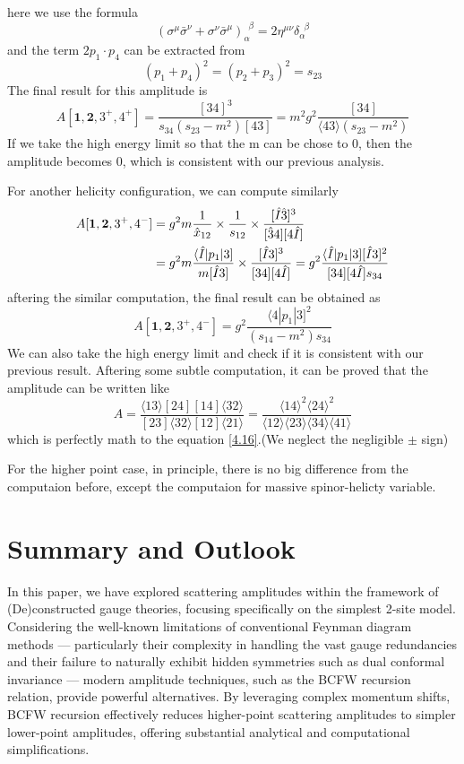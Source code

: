 \documentclass[12pt]{article}
\numberwithin{equation}{section}
\newcommand{\mdavg}[2]{\langle #1 \rangle\!\langle #2 \rangle}
\newcommand{\avg}[1]{\langle #1 \rangle}
\newcommand{\cbrak}[2]{\avg{#1}\![#2]}
\newcommand{\acbrak}[2]{[#1]\!\avg{#2}}
\newcommand{\asbra}[3]{\langle #1 | #2 |#3 ]}
\begin{document}
here we use the formula
\begin{equation}
    (\sigma^\mu\bar{\sigma}^\nu+\sigma^\nu\bar{\sigma}^\mu)_\alpha^{\phantom{a}\beta}=2\eta^{\mu\nu}\delta_\alpha^{\phantom{a}\beta}
\end{equation}
and the term $2p_1\cdot p_4$ can be extracted from
\begin{equation}
    (p_1+p_4)^2=(p_2+p_3)^2=s_{23}
\end{equation}
The final result for this amplitude is 
\begin{equation}
    A[\textbf{1},\textbf{2},3^+,4^+]=\frac{[34]^3}{s_{34}(s_{23}-m^2)[43]}=m^2g^2\frac{[34]}{\avg{43}(s_{23}-m^2)}
\end{equation}
If we take the high energy limit so that the m can be chose to 0, then the amplitude becomes 0, which is consistent with our previous analysis. 

For another helicity configuration, we can compute similarly
\begin{align}
    A[\textbf{1},\textbf{2},3^+,4^-]&=g^2m\frac{1}{\hat{x}_{12}}\times\frac{1}{s_{12}}\times\frac{[\hat{I}\hat{3}]^3}{[\hat{3}4][4\hat{I}]}\notag\\
    &=g^2m\frac{\asbra{\hat{I}}{p_1}{3}}{m[\hat{I}3]}\times\frac{[\hat{I}3]^3}{[34][4\hat{I}]}=g^2\frac{\asbra{\hat{I}}{p_1}{3}[\hat{I}3]^2}{[34][4\hat{I}]s_{34}}
\end{align}
aftering the similar computation, the final result can be obtained as 
\begin{equation}
    A[\textbf{1},\textbf{2},3^+,4^-]=g^2\frac{\asbra{4}{p_1}{3}^2}{(s_{14}-m^2)s_{34}}
\end{equation}
We can also take the high energy limit and check if it is consistent with our previous result. Aftering some subtle computation, it can be proved that the amplitude can be written like 
\begin{equation}
    A=\frac{\cbrak{13}{24}\acbrak{14}{32}}{\acbrak{23}{32}\acbrak{12}{21}}=\frac{\avg{14}^2\avg{24}^2}{\mdavg{12}{23}\!\mdavg{34}{41}}
\end{equation}
which is perfectly math to the equation \eqref{4.16}.(We neglect the negligible $\pm$ sign)

For the higher point case, in principle, there is no big difference from the computaion before, except the computaion for massive spinor-helicty variable.
\section{Summary and Outlook}
In this paper, we have explored scattering amplitudes within the framework of (De)constructed gauge theories, focusing specifically on the simplest 2-site model. Considering the well-known limitations of conventional Feynman diagram methods — particularly their complexity in handling the vast gauge redundancies and their failure to naturally exhibit hidden symmetries such as dual conformal invariance — modern amplitude techniques, such as the BCFW recursion relation, provide powerful alternatives. By leveraging complex momentum shifts, BCFW recursion effectively reduces higher-point scattering amplitudes to simpler lower-point amplitudes, offering substantial analytical and computational simplifications.
\end{document}
